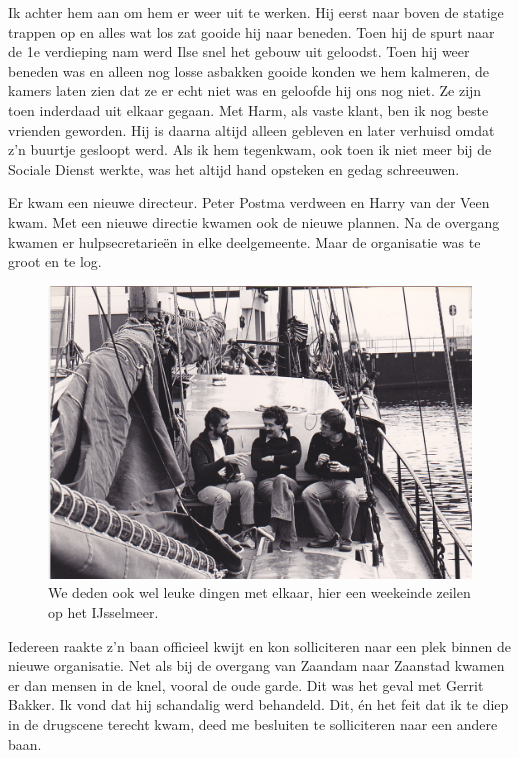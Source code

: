 \documentclass[12pt,twoside, openright]{memoir}
\begin{document}
Ik achter hem aan om hem er weer uit te werken. Hij eerst naar boven de statige trappen op en alles wat los zat gooide hij naar beneden. Toen hij de spurt naar de 1e verdieping nam werd Ilse snel het gebouw uit geloodst. Toen hij weer beneden was en alleen nog losse asbakken gooide konden we hem kalmeren, de kamers laten zien dat ze er echt niet was en geloofde hij ons nog niet. Ze zijn toen inderdaad uit elkaar gegaan. Met Harm, als vaste klant, ben ik nog beste vrienden geworden. Hij is daarna altijd alleen gebleven en later verhuisd omdat z’n buurtje gesloopt werd. Als ik hem tegenkwam, ook toen ik niet meer bij de Sociale Dienst werkte, was het altijd hand opsteken en gedag schreeuwen.

Er kwam een nieuwe directeur. Peter Postma verdween en Harry van der Veen kwam. Met een nieuwe directie kwamen ook de nieuwe plannen. Na de overgang kwamen er hulpsecretarieën in elke deelgemeente. Maar de organisatie was te groot en te log. 

\begin{figure}
\centering
\includegraphics[width=\textwidth]{img/ch42/desoos_0004}
\caption*{\footnotesize We deden ook wel leuke dingen met elkaar, hier een weekeinde zeilen op het IJsselmeer.}
\end{figure}

Iedereen raakte z’n baan officieel kwijt en kon solliciteren naar een plek binnen de nieuwe organisatie. Net als bij de overgang van Zaandam naar Zaanstad kwamen er dan mensen in de knel, vooral de oude garde. Dit was het geval met Gerrit Bakker. Ik vond dat hij schandalig werd behandeld. Dit, én het feit dat ik te diep in de drugscene terecht kwam, deed me besluiten te solliciteren naar een andere baan. 
\end{document}
